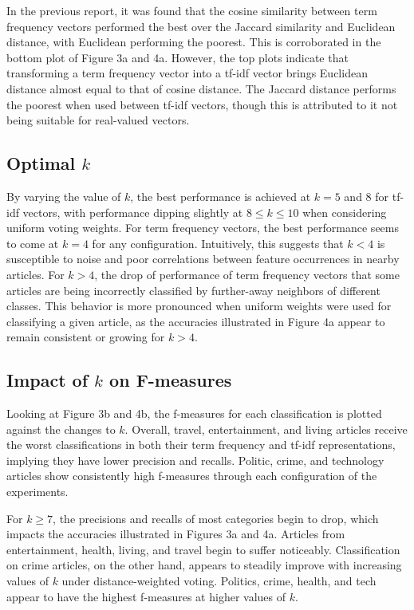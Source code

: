 \documentclass[11pt]{article}
\begin{document}
In the previous report, it was found that the cosine similarity between term frequency vectors performed the best over the Jaccard similarity and Euclidean distance, with Euclidean performing the poorest.
This is corroborated in the bottom plot of Figure 3a and 4a.
However, the top plots indicate that transforming a term frequency vector into a tf-idf vector brings Euclidean distance almost equal to that of cosine distance.
The Jaccard distance performs the poorest when used between tf-idf vectors, though this is attributed to it not being suitable for real-valued vectors.

\subsection{Optimal $k$}

By varying the value of $k$, the best performance is achieved at $k=5$ and $8$ for tf-idf vectors, with performance dipping slightly at $8 \le k \le 10$ when considering uniform voting weights.
For term frequency vectors, the best performance seems to come at $k=4$ for any configuration.
Intuitively, this suggests that $k<4$ is susceptible to noise and poor correlations between feature occurrences in nearby articles.
For $k>4$, the drop of performance of term frequency vectors that some articles are being incorrectly classified by further-away neighbors of different classes.
This behavior is more pronounced when uniform weights were used for classifying a given article, as the accuracies illustrated in Figure 4a appear to remain consistent or growing for $k>4$.

\subsection{Impact of $k$ on F-measures}

Looking at Figure 3b and 4b, the f-measures for each classification is plotted against the changes to $k$.
Overall, travel, entertainment, and living articles receive the worst classifications in both their term frequency and tf-idf representations, implying they have lower precision and recalls.
Politic, crime, and technology articles show consistently high f-measures through each configuration of the experiments.

For $k\ge7$, the precisions and recalls of most categories begin to drop, which impacts the accuracies illustrated in Figures 3a and 4a.
Articles from entertainment, health, living, and travel begin to suffer noticeably.
Classification on crime articles, on the other hand, appears to steadily improve with increasing values of $k$ under distance-weighted voting.
Politics, crime, health, and tech appear to have the highest f-measures at higher values of $k$.
\end{document}
